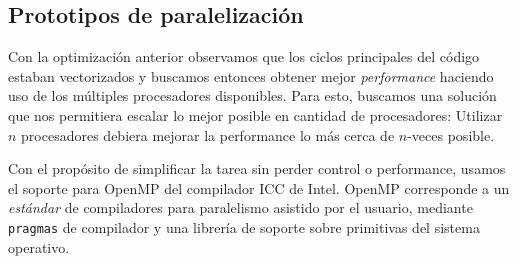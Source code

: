 




\subsection{Prototipos de paralelizaci\'on}

Con la optimizaci\'on anterior observamos que los ciclos principales del c\'odigo
estaban vectorizados y buscamos entonces obtener mejor \textit{performance} haciendo
uso de los m\'ultiples procesadores disponibles. Para esto, buscamos una soluci\'on
que nos permitiera escalar lo mejor posible en cantidad de procesadores: Utilizar
$n$ procesadores debiera mejorar la performance lo m\'as cerca de $n$-veces posible.


Con el prop\'osito de simplificar la tarea sin perder control o performance,
usamos el soporte para OpenMP del compilador ICC de Intel. OpenMP corresponde a
un \textit{est\'andar} de compiladores para paralelismo asistido por el usuario,
mediante \texttt{pragmas} de compilador y una librer\'ia de soporte sobre
primitivas del sistema operativo.

